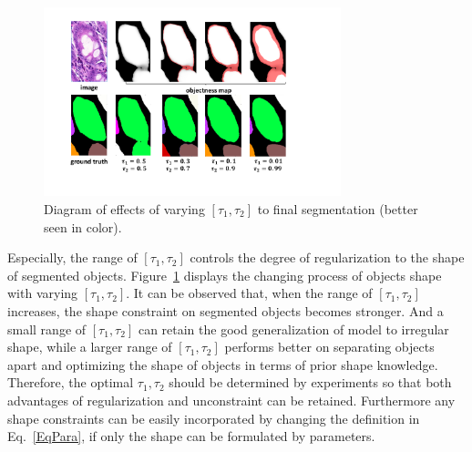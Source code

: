 \begin{figure}
    \begin{center}
        \includegraphics[width=3.4in]{figures/FigFusion.pdf}
    \end{center}
    \caption{Diagram of effects of varying $[\tau_1,\tau_2]$ to final segmentation (better seen in color).}
    \label{FigFusion}
\end{figure}
Especially, the range of $[\tau_1,\tau_2]$ controls the degree of regularization to the shape of segmented objects.
Figure~\ref{FigFusion} displays the changing process of objects shape with varying $[\tau_1,\tau_2]$.
It can be observed that, when the range of $[\tau_1,\tau_2]$ increases, the shape constraint on segmented objects becomes stronger.
And a small range of $[\tau_1,\tau_2]$ can retain the good generalization of model to irregular shape, while a larger range of $[\tau_1,\tau_2]$ performs better on separating objects apart and optimizing the shape of objects in terms of prior shape knowledge.
Therefore, the optimal $\tau_1, \tau_2$ should be determined by experiments so that both advantages of regularization and unconstraint can be retained.
Furthermore any shape constraints can be easily incorporated by changing the definition in Eq.~\ref{EqPara}, if only the shape can be formulated by parameters.

